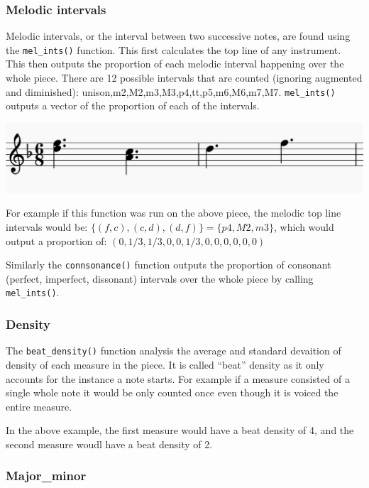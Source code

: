\documentclass[12pt,twoside]{reedthesis}
\theoremstyle{definition}
\theoremstyle{definition}
\theoremstyle{definition}
\theoremstyle{remark}
\begin{document}
\subsubsection{Melodic intervals}\label{melodic-intervals}

Melodic intervals, or the interval between two successive notes, are
found using the \texttt{mel\_ints()} function. This first calculates the
top line of any instrument. This then outputs the proportion of each
melodic interval happening over the whole piece. There are 12 possible
intervals that are counted (ignoring augmented and diminished):
unison,m2,M2,m3,M3,p4,tt,p5,m6,M6,m7,M7. \texttt{mel\_ints()} outputs a
vector of the proportion of each of the intervals.

\includegraphics{images/ex2.png}

For example if this function was run on the above piece, the melodic top
line intervals would be: \(\{(f,c),(c,d),(d,f)\} = \{p4,M2,m3\}\), which
would output a proportion of: \((0,1/3,1/3,0,0,1/3,0,0,0,0,0,0)\)

Similarly the \texttt{connsonance()} function outputs the proportion of
consonant (perfect, imperfect, dissonant) intervals over the whole piece
by calling \texttt{mel\_ints()}.

\subsubsection{Density}\label{density}

The \texttt{beat\_density()} function analysis the average and standard
devaition of density of each measure in the piece. It is called ``beat''
density as it only accounts for the instance a note starts. For example
if a measure consisted of a single whole note it would be only counted
once even though it is voiced the entire measure.

In the above example, the first measure would have a beat density of 4,
and the second measure woudl have a beat density of 2.

\subsubsection{Major\_minor}\label{major_minor}
\end{document}
